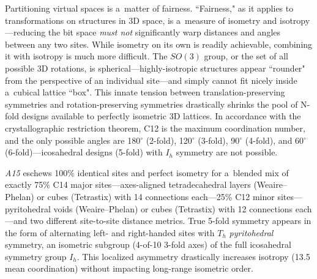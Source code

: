 \documentclass[10pt]{article}
\def\AAAB{\textit{A15}}
\def\TS{Tetrastix} \def\TSP{Tetrastix~Prism} \def\TTSp{The~Tetrastix~prism} \def\tTSp{the~Tetrastix~prism}
\def\WP{Weaire--Phelan} \def\WPH{Weaire--Phelan~Honeycomb} \def\TWPh{The~Weaire--Phelan~honeycomb}
\begin{document}
Partitioning virtual spaces is a~matter of fairness. ``Fairness," as it applies to transformations on structures in 3D space, is
a~measure of isometry and isotropy---reducing the bit space \emph{must not} significantly warp distances and angles between any
two sites. While isometry on its own is readily achievable, combining it with isotropy is much more difficult. The $SO(3)$ group,
or the set of all possible 3D rotations, is spherical---highly-isotropic structures appear ``rounder" from the perspective of an
individual site---and simply cannot fit nicely inside a~cubical lattice ``box". This innate tension between
translation-preserving symmetries and rotation-preserving symmetries drastically shrinks the pool of N-fold designs available to
perfectly isometric 3D lattices. In accordance with the crystallographic restriction theorem, C12 is the maximum coordination
number, and the only possible angles are 180$^{\circ}$ (2-fold), 120$^{\circ}$ (3-fold), 90$^{\circ}$ (4-fold), and 60$^{\circ}$
(6-fold)---icosahedral designs (5-fold) with $I_h$ symmetry are not possible.

\AAAB{} eschews 100\% identical sites and perfect isometry for a~blended mix of exactly 75\% C14 major
sites---axes-aligned tetradecahedral layers (\WP) or cubes (\TS) with 14 connections each---25\% C12 minor sites---pyritohedral
voids (\WP) or cubes (\TS) with 12 connections each---and two different site-to-site distance metrics. True 5-fold symmetry
appears in the form of alternating left- and right-handed sites with $T_h$ \emph{pyritohedral} symmetry, an isometric subgroup
(4-of-10 3-fold axes) of the full icosahedral symmetry group $I_h$. This localized asymmetry drastically increases isotropy (13.5
mean coordination) without impacting long-range isometric order.
\end{document}
